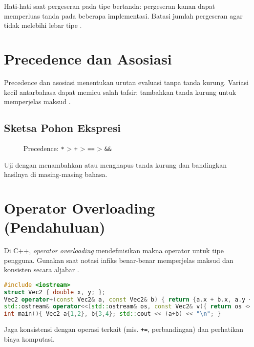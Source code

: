 \documentclass[../main.tex]{subfiles}
\begin{document}
Hati-hati saat pergeseran pada tipe bertanda: pergeseran kanan dapat memperluas tanda pada beberapa implementasi. Batasi jumlah pergeseran agar tidak melebihi lebar tipe \parencite{iso-c-draft-n1570,cpp-reference}.

\section{Precedence dan Asosiasi}
Precedence dan asosiasi menentukan urutan evaluasi tanpa tanda kurung. Variasi kecil antarbahasa dapat memicu salah tafsir; tambahkan tanda kurung untuk memperjelas maksud \parencite{gnu-c-manual,cpp-op-precedence,c-op-precedence}.

\subsection{Sketsa Pohon Ekspresi}
\begin{figure}[h]
  \centering
  \caption{Precedence: \texttt{*} > \texttt{+} > \texttt{==} > \texttt{&&}}
\end{figure}

Uji dengan menambahkan atau menghapus tanda kurung dan bandingkan hasilnya di masing-masing bahasa.

\section{Operator Overloading (Pendahuluan)}
Di C++, \emph{operator overloading} mendefinisikan makna operator untuk tipe pengguna. Gunakan saat notasi infiks benar-benar memperjelas maksud dan konsisten secara aljabar \parencite{cpp-reference,cpp-operator-overloading}.

\begin{lstlisting}[language=C++, caption={Contoh singkat operator+ pada vektor 2D}]
#include <iostream>
struct Vec2 { double x, y; };
Vec2 operator+(const Vec2& a, const Vec2& b) { return {a.x + b.x, a.y + b.y}; }
std::ostream& operator<<(std::ostream& os, const Vec2& v){ return os << '(' << v.x << ',' << v.y << ')'; }
int main(){ Vec2 a{1,2}, b{3,4}; std::cout << (a+b) << "\n"; }
\end{lstlisting}

Jaga konsistensi dengan operasi terkait (mis. \texttt{+=}, perbandingan) dan perhatikan biaya komputasi.
\end{document}
